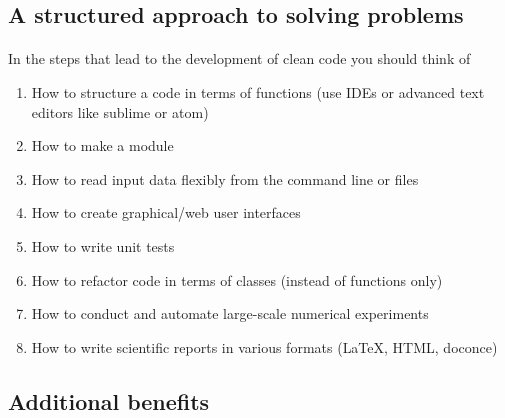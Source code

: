 \documentclass[%
oneside,                 %
final,                   %
10pt]{article}
\begin{document}
\noindent



\subsection*{A structured approach to solving problems}

\paragraph{}
In the steps that lead to the development of clean code you should  think of 
\begin{enumerate}
  \item How to structure a code in terms of functions  (use IDEs or advanced text editors like sublime or atom)

  \item How to make a module

  \item How to read input data flexibly from the command line or files

  \item How to create graphical/web user interfaces

  \item How to write unit tests  

  \item How to refactor code in terms of classes (instead of functions only)

  \item How to conduct and automate large-scale numerical experiments

  \item How to write scientific reports in various formats ({\LaTeX}, HTML, doconce)
\end{enumerate}

\noindent



\subsection*{Additional benefits}

\end{document}
